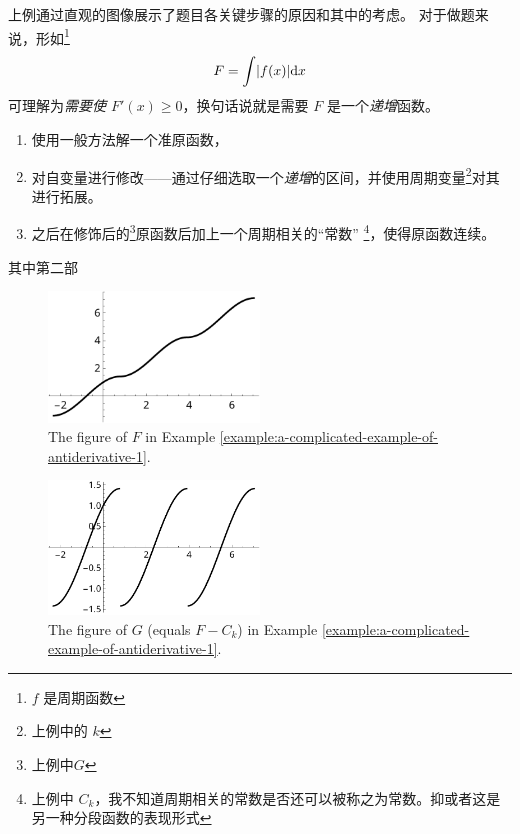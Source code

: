 上例通过直观的图像展示了题目各关键步骤的原因和其中的考虑。
对于做题来说，形如\footnote{$f$ 是周期函数}
\[
    F = \int \abs*{f(x)} \mathrm dx
\]
可理解为\emph{需要使 $F'(x) \geq 0$}，换句话说就是需要 $F$ 是一个\emph{递增}函数。
\begin{enumerate}
    \item 使用一般方法解一个准原函数，
    \item 对自变量进行修改——通过仔细选取一个\emph{递增}的区间，并使用周期变量\footnote{上例中的 $k$}对其进行拓展。
    \item 之后在修饰后的\footnote{上例中$G$}原函数后加上一个周期相关的“常数”
        \footnote{
            上例中 $C_k$，我不知道周期相关的常数是否还可以被称之为常数。抑或者这是另一种分段函数的表现形式
        }，使得原函数连续。
\end{enumerate}
其中第二部

\begin{figure}
    \centering
    \includegraphics[width=0.5\textwidth]{figure/a-complicated-antiderivative-example.pdf}
    \caption{The figure of $F$ in Example \ref{example:a-complicated-example-of-antiderivative-1}. }
    \label{fig:a-complicated-antiderivative-example}
\end{figure}

\begin{figure}
    \centering
    \includegraphics[width=0.5\textwidth]{figure/a-complicated-antiderivative-example-wrong.pdf}
    \caption{
        The figure of $G$ (equals $F - C_k$) 
        in Example
        \ref{example:a-complicated-example-of-antiderivative-1}. 
    }
    \label{fig:a-complicated-antiderivative-example-wrong}
\end{figure}

